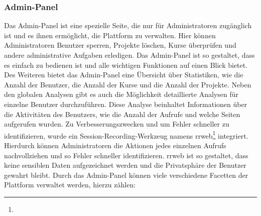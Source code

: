 \documentclass[main.tex]{subfiles}
\begin{document}
    \subsubsection{Admin-Panel}
    Das Admin-Panel ist eine spezielle Seite, die nur für Administratoren zugänglich ist und es ihnen ermöglicht, die Plattform zu verwalten.
    Hier können Administratoren Benutzer sperren, Projekte löschen, Kurse überprüfen und andere administrative Aufgaben erledigen.
    Das Admin-Panel ist so gestaltet, dass es einfach zu bedienen ist und alle wichtigen Funktionen auf einen Blick bietet.
    Des Weiteren bietet das Admin-Panel eine Übersicht über Statistiken, wie die Anzahl der Benutzer, die Anzahl der Kurse und die Anzahl der Projekte.
    Neben den globalen Analysen gibt es auch die Möglichkeit detaillierte Analysen für einzelne Benutzer durchzuführen.
    Diese Analyse beinhaltet Informationen über die Aktivitäten des Benutzers, wie die Anzahl der Aufrufe und welche Seiten aufgerufen wurden.
    Zu Verbesserungszwecken und um Fehler schneller zu identifizieren, wurde ein Session-Recording-Werkzeug namens rrweb\footnote{} integriert.
    Hierdurch können Administratoren die Aktionen jedes einzelnen Aufrufs nachvollziehen und so Fehler schneller identifizieren.
    rrweb ist so gestaltet, dass keine sensiblen Daten aufgezeichnet werden und die Privatsphäre der Benutzer gewahrt bleibt.
    Durch das Admin-Panel können viele verschiedene Facetten der Plattform verwaltet werden, hierzu zählen:
\end{document}
